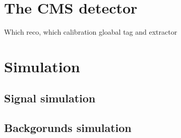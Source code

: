 \section{The CMS detector}

Which reco, which calibration gloabal tag and extractor

\section{Simulation}

\subsection{Signal simulation}

\subsection{Backgorunds simulation}
